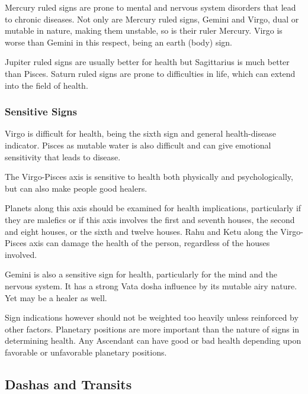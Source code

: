  

Mercury ruled signs are prone to mental and nervous system disorders that lead to chronic diseases. Not only are Mercury ruled signs, Gemini and Virgo, dual or mutable in nature, making them unstable, so is their ruler Mercury. Virgo is worse than Gemini in this respect, being an earth (body) sign.

 

Jupiter ruled signs are usually better for health but Sagittarius is much better than Pisces. Saturn ruled signs are prone to difficulties in life, which can extend into the field of health.

 

\subsubsection{Sensitive Signs}

 

Virgo is difficult for health, being the sixth sign and general health-disease indicator. Pisces as mutable water is also difficult and can give emotional sensitivity that leads to disease.

 

The Virgo-Pisces axis is sensitive to health both physically and psychologically, but can also make people good healers.
 

Planets along this axis should be examined for health implications, particularly if they are malefics or if this axis involves the first and seventh houses, the second and eight houses, or the sixth and twelve houses. Rahu and Ketu along the Virgo-Pisces axis can damage the health of the person, regardless of the houses involved.

 

Gemini is also a sensitive sign for health, particularly for the mind and the nervous system. It has a strong Vata dosha influence by its mutable airy nature. Yet may be a healer as well.

 

Sign indications however should not be weighted too heavily unless reinforced by other factors. Planetary positions are more important than the nature of signs in determining health. Any Ascendant can have good or bad health depending upon favorable or unfavorable planetary positions.

 

\subsection{Dashas and Transits}
 

